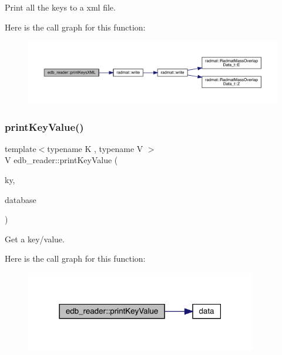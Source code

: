 Print all the keys to a xml file. 

Here is the call graph for this function\+:
\nopagebreak
\begin{figure}[H]
\begin{center}
\leavevmode
\includegraphics[width=350pt]{d8/d4f/namespaceedb__reader_add7c23b7ba3986c35bcaa28611526f89_cgraph}
\end{center}
\end{figure}
\mbox{\label{namespaceedb__reader_aa1903de7bccd11ada11d0166e1662064}} 
\subsubsection{\texorpdfstring{printKeyValue()}{printKeyValue()}}
{\footnotesize\ttfamily template$<$typename K , typename V $>$ \\
V edb\+\_\+reader\+::print\+Key\+Value (\begin{DoxyParamCaption}\item[{const \mbox{\hyperlink{test__db_8cc_ab54a55a9054a3f0247c74233453ae568}{K}} \&}]{ky,  }\item[{All\+Conf\+Store\+DB$<$ Serial\+D\+B\+Key$<$ \mbox{\hyperlink{test__db_8cc_ab54a55a9054a3f0247c74233453ae568}{K}} $>$, Serial\+D\+B\+Data$<$ typename Ensem\+Scalar$<$ V $>$\+::Type\+\_\+t $>$ $>$ \&}]{database }\end{DoxyParamCaption})}



Get a key/value. 

Here is the call graph for this function\+:
\nopagebreak
\begin{figure}[H]
\begin{center}
\leavevmode
\includegraphics[width=286pt]{d8/d4f/namespaceedb__reader_aa1903de7bccd11ada11d0166e1662064_cgraph}
\end{center}
\end{figure}
\mbox{\label{namespaceedb__reader_a15f77d6bf819d626b19549dbd921c1b0}} 
